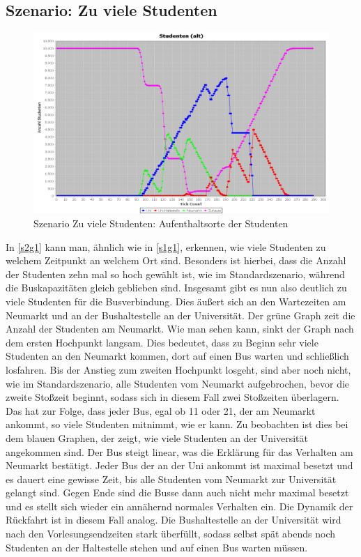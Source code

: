 \documentclass[12pt,a4paper]{scrartcl}
\begin{document}
\subsection{Szenario: Zu viele Studenten}\label{s2}

\begin{figure}
\includegraphics[scale=0.4]{Viele_Studenten_Aufenthaltsorte.png}
\caption{Szenario \glqq Zu viele Studenten\grqq : Aufenthaltsorte der Studenten}
\label{s2g1}
\end{figure}

In \autoref{s2g1} kann man, ähnlich wie in \autoref{s1g1}, erkennen, wie viele Studenten zu welchem Zeitpunkt an welchem Ort sind. Besonders ist hierbei, dass die Anzahl der Studenten zehn mal so hoch gewählt ist, wie im Standardszenario, während die Buskapazitäten gleich geblieben sind. Insgesamt gibt es nun also deutlich zu viele Studenten für die Busverbindung. Dies äußert sich an den Wartezeiten am Neumarkt und an der Bushaltestelle an der Universität.
Der grüne Graph zeit die Anzahl der Studenten am Neumarkt. Wie man sehen kann, sinkt der Graph  nach dem ersten Hochpunkt langsam. Dies bedeutet, dass zu Beginn sehr viele Studenten an den Neumarkt kommen, dort auf einen Bus warten und schließlich losfahren. Bis der Anstieg zum zweiten Hochpunkt losgeht, sind aber noch nicht, wie im Standardszenario, alle Studenten vom Neumarkt aufgebrochen, bevor die zweite Stoßzeit beginnt, sodass sich in diesem Fall zwei Stoßzeiten überlagern. Das hat zur Folge, dass jeder Bus, egal ob 11 oder 21, der am Neumarkt ankommt, so viele Studenten mitnimmt, wie er kann. Zu beobachten ist dies bei dem blauen Graphen, der zeigt, wie viele Studenten an der Universität angekommen sind. Der Bus steigt linear, was die Erklärung für das Verhalten am Neumarkt bestätigt. Jeder Bus der an der Uni ankommt ist maximal besetzt und es dauert eine gewisse Zeit, bis alle Studenten vom Neumarkt zur Universität gelangt sind. Gegen Ende sind die Busse dann auch nicht mehr maximal besetzt und es stellt sich wieder ein annähernd normales Verhalten ein. 
Die Dynamik der Rückfahrt ist in diesem Fall analog. Die Bushaltestelle an der Universität wird nach den Vorlesungsendzeiten stark überfüllt, sodass selbst spät abends noch Studenten an der Haltestelle stehen und auf einen Bus warten müssen. 
\end{document}
